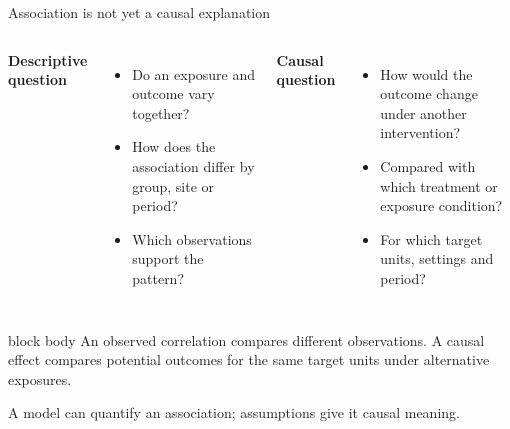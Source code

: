 \documentclass[10pt,aspectratio=169]{beamer}
\begin{document}
\begin{frame}{Association is not yet a causal explanation}

\small

\begin{columns}[T]


\textbf{Descriptive question}

\begin{itemize}
  \item Do an exposure and outcome vary together?
  \item How does the association differ by group, site or period?
  \item Which observations support the pattern?
\end{itemize}


\textbf{Causal question}

\begin{itemize}
  \item How would the outcome change under another intervention?
  \item Compared with which treatment or exposure condition?
  \item For which target units, settings and period?
\end{itemize}

\end{columns}

\vspace{0.35cm}

\begin{beamercolorbox}[rounded=true,sep=8pt]{block body}
An observed correlation compares different observations. A causal effect compares potential outcomes for the same target units under alternative exposures.
\end{beamercolorbox}

\vspace{0.15cm}

\centering
\textcolor{ukudlaRed}{A model can quantify an association; assumptions give it causal meaning.}

\end{frame}
\end{document}
